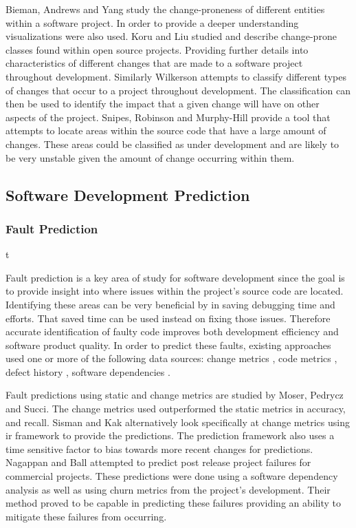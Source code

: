 Bieman, Andrews and Yang study the change-proneness of different entities within a software project\cite{Bieman2003a}. In order to provide a deeper understanding visualizations were also used. Koru and Liu studied and describe change-prone classes found within open source projects. Providing further details into characteristics of different changes that are made to a software project throughout development. Similarly Wilkerson attempts to classify different types of changes that occur to a project throughout development. The classification can then be used to identify the impact that a given change will have on other aspects of the project. Snipes, Robinson and Murphy-Hill provide a tool that attempts to locate areas within the source code that have a large amount of changes\cite{Snipes2011}. These areas could be classified as under development and are likely to be very unstable given the amount of change occurring within them.


\subsection{Software Development Prediction}

\subsubsection{Fault Prediction}t

Fault prediction is a key area of study for software development since the goal is to provide insight into where issues within the project's source code are located. Identifying these areas can be very beneficial by in saving debugging time and efforts. That saved time can be used instead on fixing those issues. Therefore accurate identification of faulty code improves both development efficiency and software product quality. In order to predict these faults, existing approaches used one or more of the following data sources: change metrics \cite{Moser2008, Sisman2012, Nagappan2007}, code metrics \cite{Moser2008, Thwin2005}, defect history \cite{Sisman2012}, software dependencies \cite{Nagappan2007}.

Fault predictions using static and change metrics are studied by Moser, Pedrycz and Succi\cite{Moser2008}. The change metrics used outperformed the static metrics in accuracy, and recall. Sisman and Kak alternatively look specifically at change metrics using \gls{ir} framework to provide the predictions. The prediction framework also uses a time sensitive factor to bias towards more recent changes for predictions. Nagappan and Ball attempted to predict post release project failures for commercial projects. These predictions were done using a software dependency analysis as well as using churn metrics from the project's development. Their method proved to be capable in predicting these failures providing an ability to mitigate these failures from occurring.

